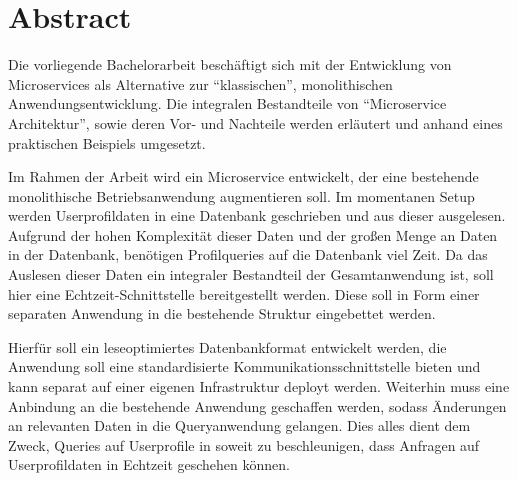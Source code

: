 

\chapter*{Abstract}
Die vorliegende Bachelorarbeit beschäftigt sich mit der Entwicklung von Microservices als Alternative zur ``klassischen'', monolithischen Anwendungsentwicklung. Die integralen Bestandteile von ``Microservice Architektur'', sowie deren Vor- und Nachteile werden erläutert und anhand eines praktischen Beispiels umgesetzt.

Im Rahmen der Arbeit wird ein Microservice entwickelt, der eine bestehende monolithische Betriebsanwendung augmentieren soll. Im momentanen Setup werden Userprofildaten in eine Datenbank geschrieben und aus dieser ausgelesen. Aufgrund der hohen Komplexität dieser Daten und der großen Menge an Daten in der Datenbank, benötigen Profilqueries auf die Datenbank viel Zeit. Da das Auslesen dieser Daten ein integraler Bestandteil der Gesamtanwendung ist, soll hier eine Echtzeit-Schnittstelle bereitgestellt werden. Diese soll in Form einer separaten Anwendung in die bestehende Struktur eingebettet werden.

Hierfür soll ein leseoptimiertes Datenbankformat entwickelt werden, die Anwendung soll eine standardisierte Kommunikationsschnittstelle bieten und kann separat auf einer eigenen Infrastruktur deployt werden. Weiterhin muss eine Anbindung an die bestehende Anwendung geschaffen werden, sodass Änderungen an relevanten Daten in die Queryanwendung gelangen. Dies alles dient dem Zweck, Queries auf Userprofile in soweit zu beschleunigen, dass Anfragen auf Userprofildaten in Echtzeit geschehen können.